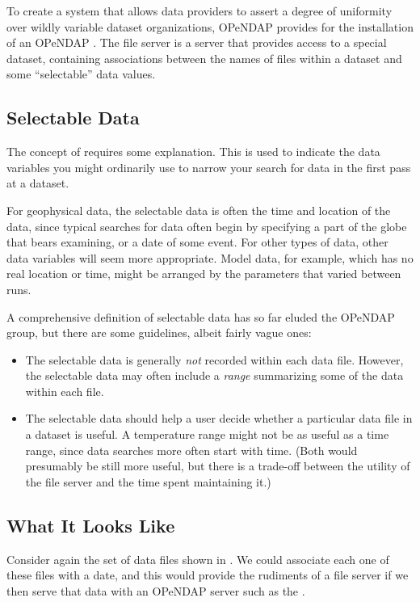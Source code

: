 To create a system that allows data providers to assert a degree of
uniformity over wildly variable dataset organizations, OPeNDAP
provides for the installation of an OPeNDAP . The
file server is a server that provides access to a special dataset,
containing associations between the names of files within a dataset
and some ``selectable'' data values.


\subsection{Selectable Data}
\label{fs,selectable}

The concept of  requires some explanation.  This
is used to indicate the data variables you might ordinarily use to
narrow your search for data in the first pass at a dataset.

For geophysical data, the selectable data is often the time and
location of the data, since typical searches for data often begin by
specifying a part of the globe that bears examining, or a date of some
event.  For other types of data, other data variables will seem more
appropriate.  Model data, for example, which has no real location or
time, might be arranged by the parameters that varied between runs.

A comprehensive definition of selectable data has so far eluded the
OPeNDAP group, but there are some guidelines, albeit fairly vague ones:

\begin{itemize}
\item The selectable data is generally \emph{not} recorded within each
  data file.  However, the selectable data may often include a
  \emph{range} summarizing some of the data within each file.
\item The selectable data should help a user decide whether a
  particular data file in a dataset is useful.  A temperature range
  might not be as useful as a time range, since data searches more
  often start with time.  (Both would presumably be still more useful,
  but there is a trade-off between the utility of the file server and
  the time spent maintaining it.)
\end{itemize}

\subsection{What It Looks Like}
\label{fs,look}

Consider again the set of data files shown in .
We could associate each one of these files with a date, and this would
provide the rudiments of a file server if we then serve that data with
an OPeNDAP server such as the \ffs .


